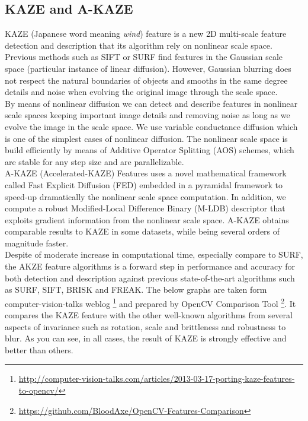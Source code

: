 \subsection {KAZE and A-KAZE} \label{subsec:kaze_akaze}
KAZE (Japanese word meaning \emph{wind}) \cite{alcantarilla2012kaze} feature is a new 2D multi-scale feature detection and description that its algorithm rely on nonlinear scale space. Previous methods such as SIFT or SURF find features in the Gaussian scale space (particular instance of linear diffusion). However, Gaussian blurring does not respect the natural boundaries of objects and smooths in the same degree details and noise when evolving the original image through the scale space.\\
By means of nonlinear diffusion we can detect and describe features in nonlinear scale spaces keeping important image details and removing noise as long as we evolve the image in the scale space. We use variable conductance diffusion which is one of the simplest cases of nonlinear diffusion. The nonlinear scale space is build efficiently by means of Additive Operator Splitting (AOS) schemes, which are stable for any step size and are parallelizable.\\
A-KAZE (Accelerated-KAZE) \cite{alcantarilla2011fast} Features uses a novel mathematical framework called Fast Explicit Diffusion (FED) embedded in a pyramidal framework to speed-up dramatically the nonlinear scale space computation. In addition, we compute a robust Modified-Local Difference Binary (M-LDB) descriptor that exploits gradient information from the nonlinear scale space. A-KAZE obtains comparable results to KAZE in some datasets, while being several orders of magnitude faster.\\
Despite of moderate increase in computational time, especially compare to SURF, the AKZE feature algorithms is a forward step in performance and accuracy for both detection and description against previous state-of-the-art algorithms such as SURF, SIFT, BRISK and FREAK.
The below graphs are taken form computer-vision-talks weblog \footnote{\url{http://computer-vision-talks.com/articles/2013-03-17-porting-kaze-features-to-opencv/}} and prepared by OpenCV Comparison Tool \footnote{\url{https://github.com/BloodAxe/OpenCV-Features-Comparison}}. It compares the KAZE feature with the other well-known algorithms from several aspects of invariance such as rotation, scale and brittleness and robustness to blur. As you can see, in all cases, the result of KAZE is strongly effective and better than others. 

